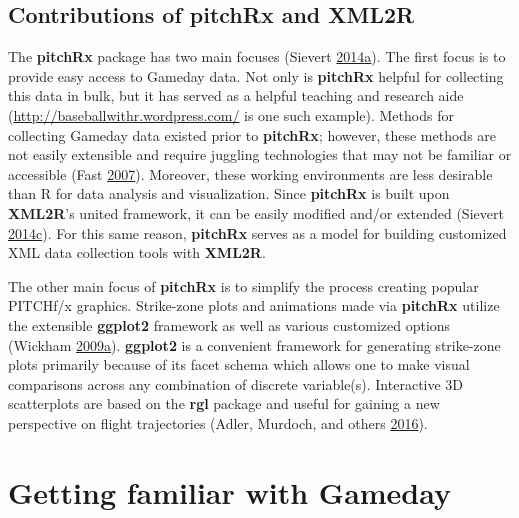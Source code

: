 \documentclass[12pt,]{isuthesis}
\begin{document}
\subsection[Contributions of pitchRx and XML2R]{Contributions of \textbf{pitchRx} and \textbf{XML2R}}

The \textbf{pitchRx} package has two main focuses (Sievert
\protect\hyperlink{ref-pitchRx}{2014}\protect\hyperlink{ref-pitchRx}{a}).
The first focus is to provide easy access to Gameday data. Not only is
\textbf{pitchRx} helpful for collecting this data in bulk, but it has
served as a helpful teaching and research aide
(\url{http://baseballwithr.wordpress.com/} is one such example). Methods
for collecting Gameday data existed prior to \textbf{pitchRx}; however,
these methods are not easily extensible and require juggling
technologies that may not be familiar or accessible (Fast
\protect\hyperlink{ref-database}{2007}). Moreover, these working
environments are less desirable than R for data analysis and
visualization. Since \textbf{pitchRx} is built upon \textbf{XML2R}'s
united framework, it can be easily modified and/or extended (Sievert
\protect\hyperlink{ref-XML2R}{2014}\protect\hyperlink{ref-XML2R}{c}).
For this same reason, \textbf{pitchRx} serves as a model for building
customized XML data collection tools with \textbf{XML2R}.

The other main focus of \textbf{pitchRx} is to simplify the process
creating popular PITCHf/x graphics. Strike-zone plots and animations
made via \textbf{pitchRx} utilize the extensible \textbf{ggplot2}
framework as well as various customized options (Wickham
\protect\hyperlink{ref-ggplot2}{2009}\protect\hyperlink{ref-ggplot2}{a}).
\textbf{ggplot2} is a convenient framework for generating strike-zone
plots primarily because of its facet schema which allows one to make
visual comparisons across any combination of discrete variable(s).
Interactive 3D scatterplots are based on the \textbf{rgl} package and
useful for gaining a new perspective on flight trajectories (Adler,
Murdoch, and others \protect\hyperlink{ref-rgl}{2016}).

\section{Getting familiar with
Gameday}\label{getting-familiar-with-gameday}
\end{document}
